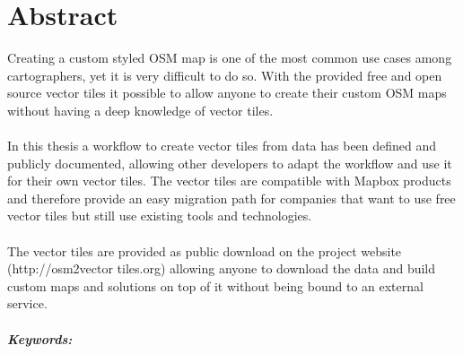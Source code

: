 

\begingroup
\let\clearpage\relax
\let\cleardoublepage\relax
\let\cleardoublepage\relax

\chapter*{Abstract} %

Creating a custom styled OSM map is one of the most common use cases
among cartographers, yet it is very difficult to do so. With the provided 
free and open source vector tiles it possible to allow anyone to
create their custom OSM maps without having a deep knowledge of vector tiles.
\\\\
In this thesis a workflow to create vector tiles from \osm{} data has been defined and publicly documented, allowing other developers to adapt the workflow and use it for their own vector tiles.
The vector tiles are compatible with Mapbox products and therefore provide an easy migration path for companies that want to use free vector tiles but still use existing tools and technologies.
\\\\
The vector tiles are provided as public download on the project website (http://osm2vector tiles.org) allowing anyone to download the data and build custom maps and solutions on top of it without being bound to an external service.

\endgroup			

\paragraph{Keywords:}\mbox{}\\
\textit{\myKeywords}

\vfill
